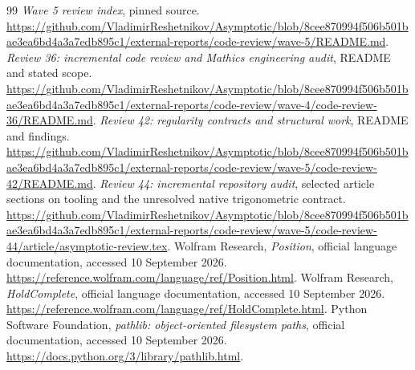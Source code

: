\documentclass[11pt,letterpaper]{article}
\begin{document}
\begin{thebibliography}{99}
 \emph{Wave 5 review index}, pinned source.
\url{https://github.com/VladimirReshetnikov/Asymptotic/blob/8cee870994f506b501bae3ea6bd4a3a7edb895c1/external-reports/code-review/wave-5/README.md}.
 \emph{Review 36: incremental code review and Mathics engineering audit}, README and stated scope.
\url{https://github.com/VladimirReshetnikov/Asymptotic/blob/8cee870994f506b501bae3ea6bd4a3a7edb895c1/external-reports/code-review/wave-4/code-review-36/README.md}.
 \emph{Review 42: regularity contracts and structural work}, README and findings.
\url{https://github.com/VladimirReshetnikov/Asymptotic/blob/8cee870994f506b501bae3ea6bd4a3a7edb895c1/external-reports/code-review/wave-5/code-review-42/README.md}.
 \emph{Review 44: incremental repository audit}, selected article sections on tooling and the unresolved native trigonometric contract.
\url{https://github.com/VladimirReshetnikov/Asymptotic/blob/8cee870994f506b501bae3ea6bd4a3a7edb895c1/external-reports/code-review/wave-5/code-review-44/article/asymptotic-review.tex}.
 Wolfram Research, \emph{Position}, official language documentation, accessed 10 September 2026.
\url{https://reference.wolfram.com/language/ref/Position.html}.
 Wolfram Research, \emph{HoldComplete}, official language documentation, accessed 10 September 2026.
\url{https://reference.wolfram.com/language/ref/HoldComplete.html}.
 Python Software Foundation, \emph{pathlib: object-oriented filesystem paths}, official documentation, accessed 10 September 2026.
\url{https://docs.python.org/3/library/pathlib.html}.
\end{thebibliography}
\end{document}
